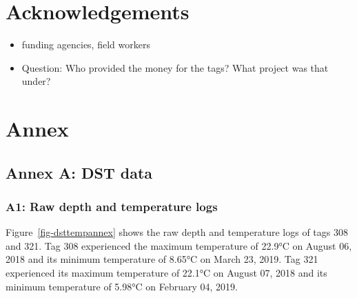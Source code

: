 \documentclass[
  authoryear,
  review,
  3p]{elsarticle}
\begin{document}
\hypertarget{acknowledgements}{%
\section*{Acknowledgements}\label{acknowledgements}}

\begin{itemize}
\item
  funding agencies, field workers
\item
  Question: Who provided the money for the tags? What project was that
  under?
\end{itemize}

\hypertarget{annex}{%
\section*{Annex}\label{annex}}

\hypertarget{annex-a-dst-data}{%
\subsection*{\texorpdfstring{\textbf{Annex A}: DST
data}{Annex A: DST data}}\label{annex-a-dst-data}}

\hypertarget{a1-raw-depth-and-temperature-logs}{%
\subsubsection*{\texorpdfstring{\textbf{A1}: Raw depth and temperature
logs}{A1: Raw depth and temperature logs}}\label{a1-raw-depth-and-temperature-logs}}

Figure~\ref{fig-dsttempannex} shows the raw depth and temperature logs
of tags 308 and 321. Tag 308 experienced the maximum temperature of
22.9°C on August 06, 2018 and its minimum temperature of 8.65°C on March
23, 2019. Tag 321 experienced its maximum temperature of 22.1°C on
August 07, 2018 and its minimum temperature of 5.98°C on February 04,
2019.
\end{document}
